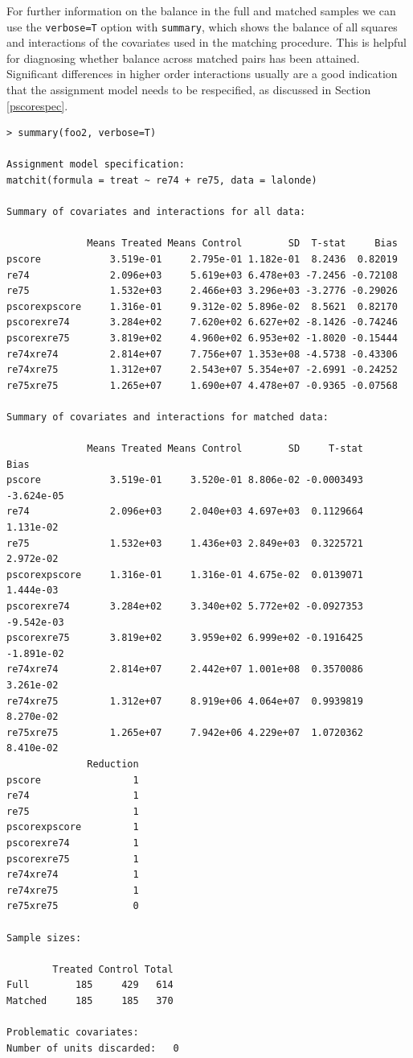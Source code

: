 \documentclass[oneside,letterpaper,titlepage]{article}
\begin{document}
For further information on the balance in the full and matched samples
we can use the {\tt verbose=T} option with {\tt summary}, which shows
the balance of all squares and interactions of the covariates used in
the matching procedure.  This is helpful for diagnosing whether
balance across matched pairs has been attained.  Significant
differences in higher order interactions usually are a good indication
that the assignment model needs to be respecified, as discussed in
Section \ref{pscorespec}.

\begin{verbatim}
> summary(foo2, verbose=T)
 
Assignment model specification:
matchit(formula = treat ~ re74 + re75, data = lalonde)
 
Summary of covariates and interactions for all data:
 
              Means Treated Means Control        SD  T-stat     Bias
pscore            3.519e-01     2.795e-01 1.182e-01  8.2436  0.82019
re74              2.096e+03     5.619e+03 6.478e+03 -7.2456 -0.72108
re75              1.532e+03     2.466e+03 3.296e+03 -3.2776 -0.29026
pscorexpscore     1.316e-01     9.312e-02 5.896e-02  8.5621  0.82170
pscorexre74       3.284e+02     7.620e+02 6.627e+02 -8.1426 -0.74246
pscorexre75       3.819e+02     4.960e+02 6.953e+02 -1.8020 -0.15444
re74xre74         2.814e+07     7.756e+07 1.353e+08 -4.5738 -0.43306
re74xre75         1.312e+07     2.543e+07 5.354e+07 -2.6991 -0.24252
re75xre75         1.265e+07     1.690e+07 4.478e+07 -0.9365 -0.07568
 
Summary of covariates and interactions for matched data:
 
              Means Treated Means Control        SD     T-stat       Bias
pscore            3.519e-01     3.520e-01 8.806e-02 -0.0003493 -3.624e-05
re74              2.096e+03     2.040e+03 4.697e+03  0.1129664  1.131e-02
re75              1.532e+03     1.436e+03 2.849e+03  0.3225721  2.972e-02
pscorexpscore     1.316e-01     1.316e-01 4.675e-02  0.0139071  1.444e-03
pscorexre74       3.284e+02     3.340e+02 5.772e+02 -0.0927353 -9.542e-03
pscorexre75       3.819e+02     3.959e+02 6.999e+02 -0.1916425 -1.891e-02
re74xre74         2.814e+07     2.442e+07 1.001e+08  0.3570086  3.261e-02
re74xre75         1.312e+07     8.919e+06 4.064e+07  0.9939819  8.270e-02
re75xre75         1.265e+07     7.942e+06 4.229e+07  1.0720362  8.410e-02
              Reduction
pscore                1
re74                  1
re75                  1
pscorexpscore         1
pscorexre74           1
pscorexre75           1
re74xre74             1
re74xre75             1
re75xre75             0
 
Sample sizes:
 
        Treated Control Total
Full        185     429   614
Matched     185     185   370
 
Problematic covariates:
Number of units discarded:   0
\end{verbatim}
\end{document}
